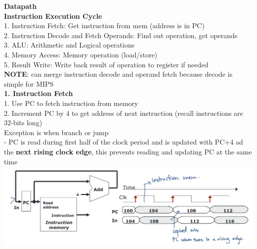 \documentclass[10pt, a4paper]{article}
\newcommand{\highlight}[1]{{\color{red}\textbf{#1}}}
\begin{document}
\begin{multicols*}{3}
		{\normalsize\textbf{Datapath}}\\
		\textbf{Instruction Execution Cycle}\\
		1. Instruction Fetch: Get instruction from mem (address is in PC)\\
		2. Instruction Decode and Fetch Operands: Find out operation, get operands\\
		3. ALU: Arithmetic and Logical operations\\
		4. Memory Access: Memory operation (load/store)\\
		5. Result Write: Write back result of operation to register if needed\\
		\highlight{NOTE}: can merge instruction decode and operand fetch because decode is simple for MIPS\\
		
		\textbf{1. Instruction Fetch}\\
		1. Use PC to fetch instruction from memory\\
		2. Increment PC by 4 to get address of next instruction (recall instructions are 32-bits long)\\
		Exception is when branch or jump\\
		- PC is read during first half of the clock period and is updated with PC+4 ad the \textbf{next rising clock edge}, this prevents reading and updating PC at the same time\\
		\includegraphics[scale=.15]{./assets/clock}\\
		

\end{multicols*}
\end{document}
